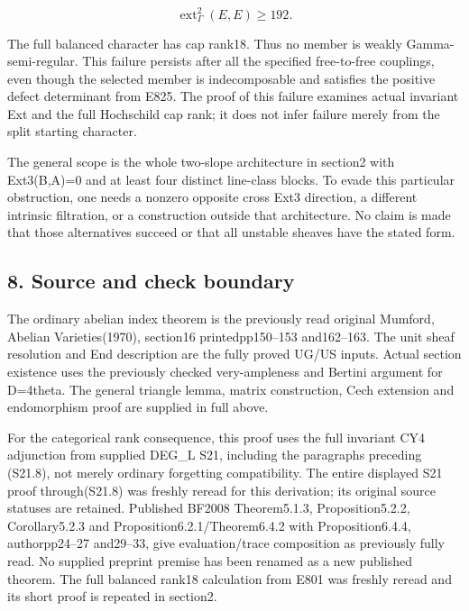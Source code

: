 \[
 \operatorname{ext}^2_\Gamma(E,E)\ge192.
 \tag{E826.14}
\]

The full balanced character has cap rank18. Thus no member is weakly
Gamma-semi-regular. This failure persists after all the specified
free-to-free couplings, even though the selected member is indecomposable
and satisfies the positive defect determinant from E825. The proof of this
failure examines actual invariant Ext and the full Hochschild cap rank; it
does not infer failure merely from the split starting character.

The general scope is the whole two-slope architecture in section2 with
Ext3(B,A)=0 and at least four distinct line-class blocks. To evade this
particular obstruction, one needs a nonzero opposite cross Ext3 direction, a
different intrinsic filtration, or a construction outside that architecture.
No claim is made that those alternatives succeed or that all unstable
sheaves have the stated form.

\subsection{8. Source and check boundary}\label{SF-E826:source-and-check-boundary}

The ordinary abelian index theorem is the previously read original Mumford,
Abelian Varieties(1970), section16 printedpp150--153 and162--163. The unit
sheaf resolution and End description are the fully proved UG/US inputs.
Actual section existence uses the previously checked very-ampleness and
Bertini argument for D=4theta. The general triangle lemma, matrix
construction, Cech extension and endomorphism proof are supplied in full
above.

For the categorical rank consequence, this proof uses the full invariant CY4
adjunction from supplied DEG\_L S21, including the paragraphs preceding
(S21.8), not merely ordinary forgetting compatibility. The entire displayed
S21 proof through(S21.8) was freshly reread for this derivation; its
original source statuses are retained. Published BF2008 Theorem5.1.3,
Proposition5.2.2, Corollary5.2.3 and Proposition6.2.1/Theorem6.4.2 with
Proposition6.4.4, authorpp24--27 and29--33, give evaluation/trace
composition as previously fully read. No supplied preprint premise has been
renamed as a new published theorem. The full balanced rank18 calculation
from E801 was freshly reread and its short proof is repeated in section2.

